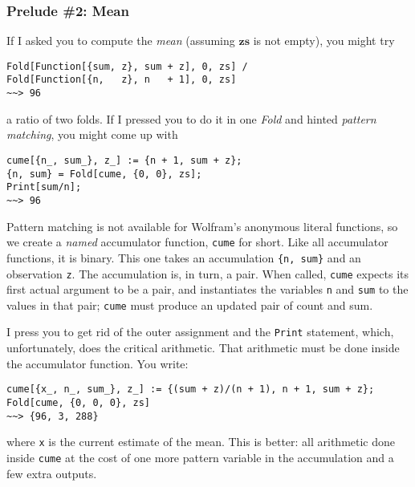 \documentclass[10pt,oneside,x11names]{article}
\begin{document}
\subsubsection{Prelude \#2: Mean}
\label{sec:orgheadline6}

If I asked you to compute the \emph{mean} (assuming \(\mathbold{zs}\) is not
empty), you might try

\begin{verbatim}
Fold[Function[{sum, z}, sum + z], 0, zs] /
Fold[Function[{n,   z}, n   + 1], 0, zs]
~~> 96
\end{verbatim}

\noindent a ratio of two folds.
If I pressed you to do it in one \emph{Fold} and hinted \emph{pattern matching},
you might come up with

\begin{verbatim}
cume[{n_, sum_}, z_] := {n + 1, sum + z};
{n, sum} = Fold[cume, {0, 0}, zs];
Print[sum/n];
~~> 96
\end{verbatim}

Pattern matching is not available for Wolfram's anonymous literal functions, so
we create a \emph{named} accumulator function, \texttt{cume} for short.
Like all accumulator functions, it is binary. This one takes an accumulation
\texttt{\{n, sum\}} and an observation \texttt{z}. The accumulation is, in turn, a pair. When
called, \texttt{cume} expects its first actual argument to be a pair, and
instantiates the variables \texttt{n} and \texttt{sum} to the values in that pair;
\texttt{cume} must produce an updated pair of count and sum.

I press you to get rid of the outer assignment and the \texttt{Print} statement, which,
unfortunately, does the critical arithmetic. That arithmetic must be done inside
the accumulator function. You write:

\begin{verbatim}
cume[{x_, n_, sum_}, z_] := {(sum + z)/(n + 1), n + 1, sum + z};
Fold[cume, {0, 0, 0}, zs]
~~> {96, 3, 288}
\end{verbatim}

\noindent where \texttt{x} is the current estimate of the mean. This is better:
all arithmetic done inside \texttt{cume} at the cost of one more
pattern variable in the accumulation and a few extra outputs.
\end{document}
